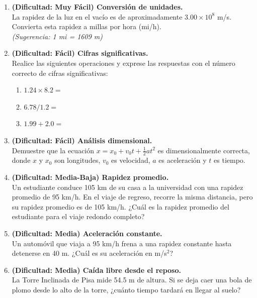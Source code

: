 \documentclass[12pt, a4paper]{article}
\begin{document}
\begin{enumerate}[leftmargin=*, label=\textbf{Problema \arabic*.}, itemsep=2em]

    \item \textbf{(Dificultad: Muy Fácil) Conversión de unidades.} \\
    La rapidez de la luz en el vacío es de aproximadamente $3.00 \times 10^8$ m/s. Convierta esta rapidez a millas por hora (mi/h). \\
    \textit{(Sugerencia: 1 mi = 1609 m)}

    \item \textbf{(Dificultad: Fácil) Cifras significativas.} \\
    Realice las siguientes operaciones y exprese las respuestas con el número correcto de cifras significativas:
    \begin{enumerate}[label=\alph*)]
        \item $1.24 \times 8.2 = $
        \item $6.78 / 1.2 = $
        \item $1.99 + 2.0 = $
    \end{enumerate}

    \item \textbf{(Dificultad: Fácil) Análisis dimensional.} \\
    Demuestre que la ecuación $x = x_0 + v_0 t + \frac{1}{2}at^2$ es dimensionalmente correcta, donde $x$ y $x_0$ son longitudes, $v_0$ es velocidad, $a$ es aceleración y $t$ es tiempo.

    \item \textbf{(Dificultad: Media-Baja) Rapidez promedio.} \\
    Un estudiante conduce 105 km de su casa a la universidad con una rapidez promedio de 95 km/h. En el viaje de regreso, recorre la misma distancia, pero su rapidez promedio es de 105 km/h. ¿Cuál es la rapidez promedio del estudiante para el viaje redondo completo?

    \item \textbf{(Dificultad: Media) Aceleración constante.} \\
    Un automóvil que viaja a 95 km/h frena a una rapidez constante hasta detenerse en 40 m. ¿Cuál es su aceleración en m/s$^2$?

    \item \textbf{(Dificultad: Media) Caída libre desde el reposo.} \\
    La Torre Inclinada de Pisa mide 54.5 m de altura. Si se deja caer una bola de plomo desde lo alto de la torre, ¿cuánto tiempo tardará en llegar al suelo?


\end{enumerate}
\end{document}

